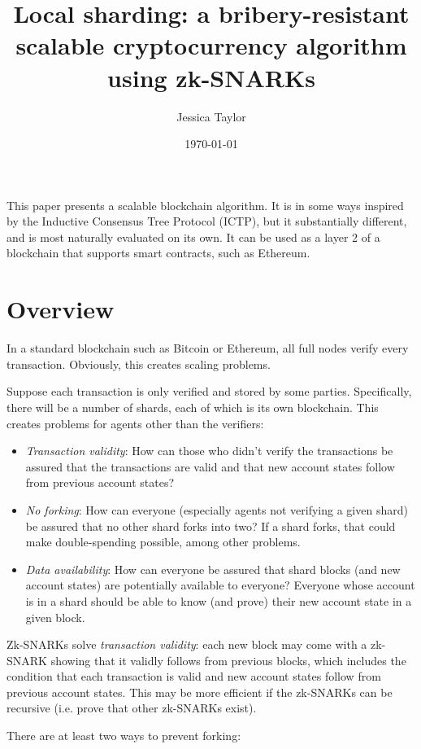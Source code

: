 \documentclass{article}
\title{Local sharding: a bribery-resistant scalable cryptocurrency algorithm using zk-SNARKs}
\date{\today}
\author{Jessica Taylor}
\begin{document}
\maketitle

This paper presents a scalable blockchain algorithm.  It is in some ways inspired by the Inductive Consensus Tree Protocol (ICTP), but it substantially different, and is most naturally evaluated on its own.  It can be used as a layer 2 of a blockchain that supports smart contracts, such as Ethereum.

\section{Overview}

In a standard blockchain such as Bitcoin or Ethereum, all full nodes verify every transaction.  Obviously, this creates scaling problems.

Suppose each transaction is only verified and stored by some parties.  Specifically, there will be a number of shards, each of which is its own blockchain.  This creates problems for agents other than the verifiers:

\begin{itemize}
  \item \emph{Transaction validity}: How can those who didn't verify the transactions be assured that the transactions are valid and that new account states follow from previous account states?
  \item \emph{No forking}: How can everyone (especially agents not verifying a given shard) be assured that no other shard forks into two?  If a shard forks, that could make double-spending possible, among other problems.
  \item \emph{Data availability}: How can everyone be assured that shard blocks (and new account states) are potentially available to everyone?  Everyone whose account is in a shard should be able to know (and prove) their new account state in a given block.
\end{itemize}

Zk-SNARKs solve \emph{transaction validity}: each new block may come with a zk-SNARK showing that it validly follows from previous blocks, which includes the condition that each transaction is valid and new account states follow from previous account states.  This may be more efficient if the zk-SNARKs can be recursive (i.e. prove that other zk-SNARKs exist).

There are at least two ways to prevent forking:
\end{document}
